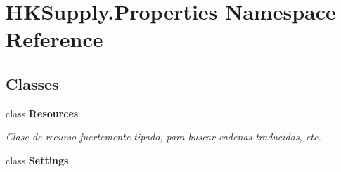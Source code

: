 \hypertarget{namespace_h_k_supply_1_1_properties}{}\section{H\+K\+Supply.\+Properties Namespace Reference}
\label{namespace_h_k_supply_1_1_properties}
\subsection*{Classes}
\begin{DoxyCompactItemize}
\item 
class {\bfseries Resources}
\begin{DoxyCompactList}\small\item\em Clase de recurso fuertemente tipado, para buscar cadenas traducidas, etc. \end{DoxyCompactList}\item 
class {\bfseries Settings}
\end{DoxyCompactItemize}
